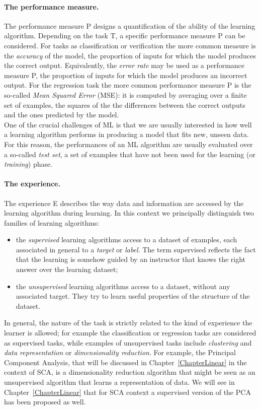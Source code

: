 \paragraph*{The performance measure.} The performance measure P designs a quantification of the ability of the learning algorithm. Depending on the task T, a specific performance measure P can be considered. For tasks as classification or verification the more common measure is the \emph{accuracy} of the model, \ie the proportion of inputs for which the model produces the correct output. Equivalently, the \emph{error rate} may be used as a performance measure P, \ie the proportion of inputs for which the model produces an incorrect output. For the regression task the more common performance measure P is the so-called \emph{Mean Squared Error} (MSE): it is computed by averaging over a finite set of examples, the squares of the the differences between the correct outputs and the ones predicted by the model.\\
One of the crucial challenges of ML is that we are usually interested in how well a learning algorithm performs in producing a model that fits new, unseen data. For this reason, the performances of an ML algorithm are usually evaluated over a so-called \emph{test set}, \ie a set of examples that have not been used for the learning (or \emph{training}) phase. 

\paragraph*{The experience.} The experience E describes the way data and information are accessed by the learning algorithm during learning. In this context we principally distinguish two families of learning algorithms: 
\begin{itemize}
\item the \emph{supervised} learning algorithms access to a dataset of examples, each associated in general to a \emph{target} or \emph{label}. The term supervised reflects the fact that the learning is somehow guided by an instructor that knows the right answer over the learning dataset;
\item the \emph{unsupervised} learning algorithms access to a dataset, without any associated target. They try to learn useful properties of the structure of the dataset. 
\end{itemize}
In general, the nature of the task is strictly related to the kind of experience the learner is allowed; for example the classification or regression tasks are considered as supervised tasks, while examples of unsupervised tasks include \emph{clustering} and \emph{data representation} or \emph{dimensionality reduction}. For example, the Principal Component Analysis, that will be discussed in Chapter~\ref{ChapterLinear} in the context of SCA, is a dimensionality reduction algorithm that might be seen as an unsupervised algorithm that learns a representation of data. We will see in Chapter~\ref{ChapterLinear} that for SCA context a supervised version of the PCA has been proposed as well. 



